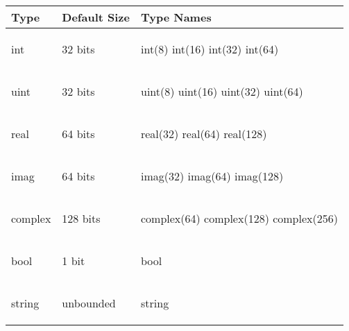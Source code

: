 \begin{center}
\begin{tabular}{|l|l|l|}
\hline
{\bf Type} & {\bf Default Size} & {\bf Type Names}  \\
\hline
\begin{chapel}
int
\end{chapel}
& 32 bits & 
\begin{chapel}
int(8)
int(16) 
int(32) 
int(64) 
\end{chapel} \\
\hline
\begin{chapel}
uint
\end{chapel}
& 32 bits & 
\begin{chapel}
uint(8)
uint(16) 
uint(32) 
uint(64) 
\end{chapel} \\
\hline
\begin{chapel}
real
\end{chapel}
& 64 bits & 
\begin{chapel}
real(32)
real(64)
real(128)
\end{chapel} \\
\hline
\begin{chapel}
imag
\end{chapel} 
& 64 bits & 
\begin{chapel}
imag(32) 
imag(64)
imag(128)
\end{chapel} \\
\hline
\begin{chapel}
complex
\end{chapel}
& 128 bits & 
\begin{chapel}
complex(64)
complex(128)
complex(256)
\end{chapel} \\
\hline
\begin{chapel}
bool
\end{chapel} 
& 1 bit & 
\begin{chapel}
bool
\end{chapel}  \\
\hline
\begin{chapel}
string
\end{chapel}
& unbounded & 
\begin{chapel}
string 
\end{chapel} \\
\hline
\end{tabular}
\end{center}


